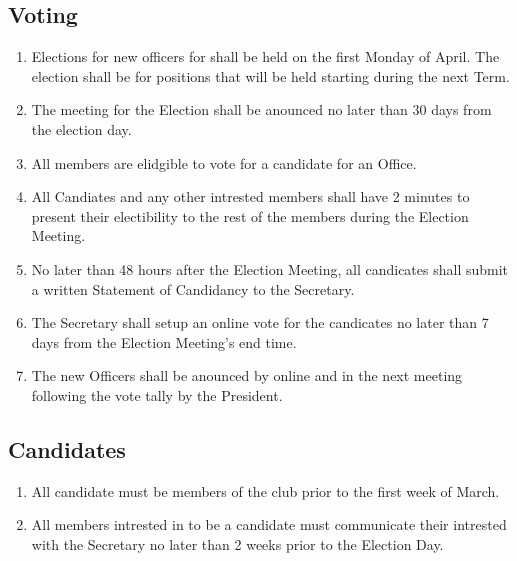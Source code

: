 \documentclass[a4paper,12pt]{article}
\begin{document}
\subsection{Voting} \label{election-vote}
\begin{enumerate}
  \item \label{elec-time} Elections for new officers for shall be held on the first Monday of April. The election shall be for positions that will be held starting during the next Term.
  \item The meeting for the Election shall be anounced no later than 30 days from the election day.
  \item All members are elidgible to vote for a candidate for an Office.
  \item All Candiates and any other intrested members shall have 2 minutes to present their electibility to the rest of the members during the Election Meeting.
  \item No later than 48 hours after the Election Meeting, all candicates shall submit a written Statement of Candidancy to the Secretary.
  \item The Secretary shall setup an online vote for the candicates no later than 7 days from the Election Meeting's end time.
  \item The new Officers shall be anounced by online and in the next meeting following the vote tally by the President.
\end{enumerate}

\subsection{Candidates}
\begin{enumerate}
  \item All candidate must be members of the club prior to the first week of March.
  \item All members intrested in to be a candidate must communicate their intrested with the Secretary no later than 2 weeks prior to the Election Day.
\end{enumerate}
\end{document}
